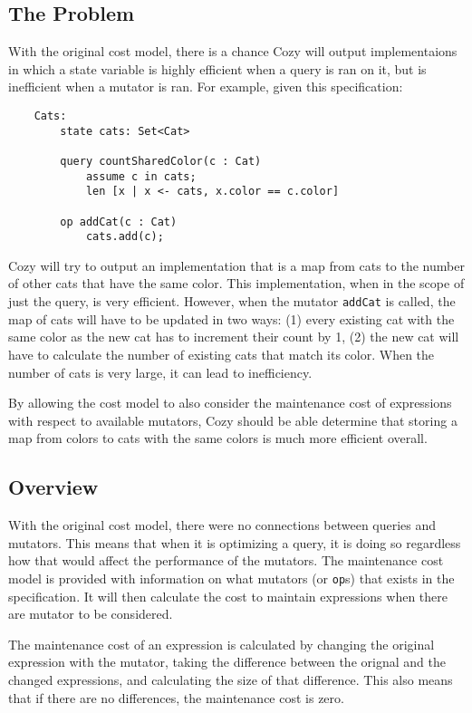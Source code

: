 \newcommand{\code}[1]{\texttt{#1}}

\subsection{The Problem}
With the original cost model, there is a chance Cozy will output implementaions
in which a state variable is highly efficient when a query is ran on it, but
is inefficient when a mutator is ran. For example, given this specification:

\begin{lstlisting}
    Cats:
        state cats: Set<Cat>

        query countSharedColor(c : Cat)
            assume c in cats;
            len [x | x <- cats, x.color == c.color]

        op addCat(c : Cat)
            cats.add(c);
\end{lstlisting}

Cozy will try to output an implementation that is a map from cats to the number
of other cats that have the same color. This implementation, when in the scope
of just the query, is very efficient. However, when the mutator \code{addCat} is
called, the map of cats will have to be updated in two ways: (1) every existing
cat with the same color as the new cat has to increment their count by 1, (2)
the new cat will have to calculate the number of existing cats that match its
color. When the number of cats is very large, it can lead to inefficiency.

By allowing the cost model to also consider the maintenance cost of expressions
with respect to available mutators, Cozy should be able determine that storing
a map from colors to cats with the same colors is much more efficient overall.

\subsection{Overview}
With the original cost model, there were no connections between queries and
mutators. This means that when it is optimizing a query, it is doing so
regardless how that would affect the performance of the mutators.
The maintenance cost model is provided with information on what mutators (or
\code{op}s) that exists in the specification. It will then calculate the cost to
maintain expressions when there are mutator to be considered.

The maintenance cost of an expression is calculated by changing the original
expression with the mutator, taking the difference between the orignal and the
changed expressions, and calculating the size of that difference. This also
means that if there are no differences, the maintenance cost is zero.

